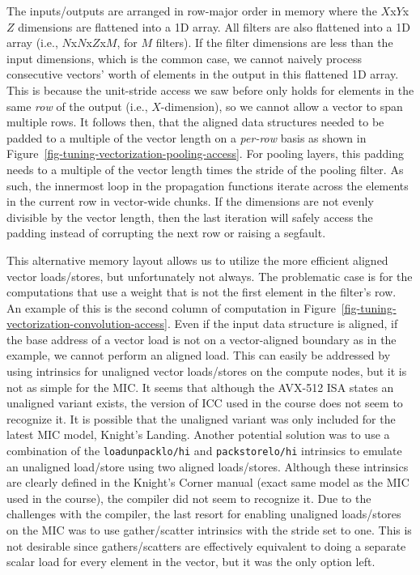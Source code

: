 The inputs/outputs are arranged in row-major order in memory where the
$X$x$Y$x$Z$ dimensions are flattened into a 1D array. All filters are
also flattened into a 1D array (i.e., $N$x$N$x$Z$x$M$, for $M$
filters). If the filter dimensions are less than the input dimensions,
which is the common case, we cannot naively process consecutive vectors'
worth of elements in the output in this flattened 1D array. This is
because the unit-stride access we saw before only holds for elements in
the same \emph{row} of the output (i.e., $X$-dimension), so we cannot
allow a vector to span multiple rows. It follows then, that the aligned
data structures needed to be padded to a multiple of the vector length on
a \emph{per-row} basis as shown in
Figure~\ref{fig-tuning-vectorization-pooling-access}. For pooling layers,
this padding needs to a multiple of the vector length times the stride of
the pooling filter. As such, the innermost loop in the propagation
functions iterate across the elements in the current row in vector-wide
chunks. If the dimensions are not evenly divisible by the vector length,
then the last iteration will safely access the padding instead of
corrupting the next row or raising a segfault.

This alternative memory layout allows us to utilize the more efficient
aligned vector loads/stores, but unfortunately not always. The
problematic case is for the computations that use a weight that is not
the first element in the filter's row. An example of this is the second
column of computation in
Figure~\ref{fig-tuning-vectorization-convolution-access}. Even if the
input data structure is aligned, if the base address of a vector load is
not on a vector-aligned boundary as in the example, we cannot perform an
aligned load. This can easily be addressed by using intrinsics for
unaligned vector loads/stores on the compute nodes, but it is not as
simple for the MIC. It seems that although the AVX-512 ISA states an
unaligned variant exists, the version of ICC used in the course does not
seem to recognize it. It is possible that the unaligned variant was only
included for the latest MIC model, Knight's Landing. Another potential
solution was to use a combination of the \texttt{loadunpacklo/hi} and
\texttt{packstorelo/hi} intrinsics to emulate an unaligned load/store
using two aligned loads/stores. Although these intrinsics are clearly
defined in the Knight's Corner manual (exact same model as the MIC used
in the course), the compiler did not seem to recognize it. Due to the
challenges with the compiler, the last resort for enabling unaligned
loads/stores on the MIC was to use gather/scatter intrinsics with the
stride set to one. This is not desirable since gathers/scatters are
effectively equivalent to doing a separate scalar load for every element
in the vector, but it was the only option left.

